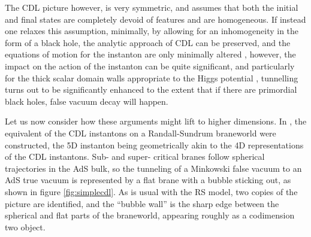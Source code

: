 \documentclass[aps,12pt,prd,superscriptaddress,preprintnumbers, 
	amssymb,
	amsmath,
	notitlepage,
	longbibliography,
	nofootinbib]{revtex4-1}
\begin{document}
The CDL picture however, is very symmetric, and assumes that both the 
initial and final states are completely devoid of features and are 
homogeneous. If instead one relaxes this assumption, minimally, by
allowing for an inhomogeneity in the form of a black hole, the analytic
approach of CDL can be preserved, and the equations of motion for
the instanton are only minimally altered \cite{GMW,BGM1,BGM2,BGM3},
however, the impact on the action of the instanton can be quite
significant, and particularly for the thick scalar domain walls
appropriate to the Higgs potential \cite{BGM3}, tunnelling
turns out to be significantly enhanced to the extent that if there
are primordial black holes, false vacuum decay will happen.

Let us now consider how these arguments might lift to higher 
dimensions. In \cite{Gregory:2001dn}, the equivalent of the CDL
instantons on a Randall-Sundrum braneworld were constructed,
the 5D instanton being geometrically akin to the 4D representations
of the CDL instantons. Sub- and super- critical branes follow
spherical trajectories in the AdS bulk, so the tunneling of a Minkowski
false vacuum to an AdS true vacuum is represented by a flat
brane with a bubble sticking out, as shown in figure \ref{fig:simplecdl}.
As is usual with the RS model, two copies of the picture are identified,
and the ``bubble wall'' is the sharp edge between the spherical and 
flat parts of the braneworld,
appearing roughly as a codimension two object. 
\end{document}
